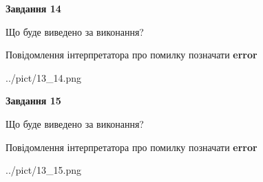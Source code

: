 \documentclass[11pt, ukrainian]{article}
\begin{document}
{\begin {large}
{\begin {center}\textbf{Завдання 14}\end {center}}\par
Що буде виведено за виконання? \par
Повідомлення інтерпретатора про помилку позначати \textbf{error}

\begin{center}
	{../pict/13_14.png}
\end{center}
\newpage

{\begin {center}\textbf{Завдання 15}\end {center}}\par
Що буде виведено за виконання? \par
Повідомлення інтерпретатора про помилку позначати \textbf{error}

\begin{center}
	{../pict/13_15.png}
\end{center}
\newpage

\end {large}}
\end{document}

